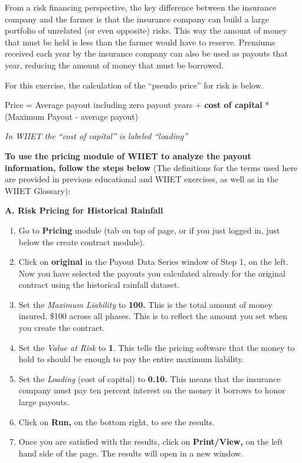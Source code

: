 \documentclass[letterpaper,10pt,english]{sphinxmanual}
\begin{document}
From a risk financing perspective, the key difference between the insurance company and the farmer is that the insurance company can build a large portfolio of unrelated (or even opposite) risks. This way the amount of money that must be held is less than the farmer would have to reserve. Premiums received each year by the insurance company can also be used as payouts that year, reducing the amount of money that must be borrowed.

For this exercise, the calculation of the ``pseudo price'' for risk is below.

Price = Average payout including zero payout years + \textbf{cost of capital} * (Maximum Payout - average payout)

\emph{In WIIET the ``cost of capital'' is labeled ``loading''}

\textbf{To use the pricing module of WIIET to analyze the payout information, follow the steps below} (The definitions for the terms used here are provided in previous educational and WIIET exercises, as well as in the WIIET Glossary):

\textbf{A. Risk Pricing for Historical Rainfall}
\begin{enumerate}
\item {} 
Go to \textbf{Pricing} module (tab on top of page, or if you just logged in, just below the create contract module).

\item {} 
Click on \textbf{original} in the Payout Data Series window of Step 1, on the left. Now you have selected the payouts you calculated already for the original contract using the historical rainfall dataset.

\item {} 
Set the \emph{Maximum Liability} to \textbf{100.} This is the total amount of money insured, \$100 across all phases. This is to reflect the amount you set when you create the contract.

\item {} 
Set the \emph{Value at Risk} to \textbf{1}. This tells the pricing software that the money to hold to should be enough to pay the entire maximum liability.

\item {} 
Set the \emph{Loading} (cost of capital) to \textbf{0.10.}  This means that the insurance company must pay ten percent interest on the money it borrows to honor large payouts.

\item {} 
Click on \textbf{Run,} on the bottom right, to see the results.

\item {} 
Once you are satisfied with the results, click on \textbf{Print/View,} on the left hand side of the page. The results will open in a new window.

\end{enumerate}
\end{document}
